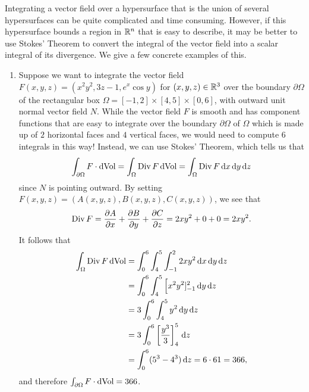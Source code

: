 Integrating a vector field over a hypersurface that is the union of several 
hypersurfaces can be quite complicated and time consuming. However, 
if this hypersurface bounds a region in $\mathbb{R}^n$ that is easy to describe, it 
may be better to use Stokes' Theorem to convert the integral of the 
vector field into a scalar integral of its divergence. We give a few concrete 
examples of this. 
\begin{enumerate}[(1)]
    \item Suppose we want to integrate the vector field $F(x, y, z) = 
    (x^2y^2, 3z-1, e^x\cos y)$ for $(x, y, z) \in \mathbb{R}^3$ over the boundary 
    $\partial\Omega$ of the rectangular box $\Omega = [-1, 2] \times [4, 5] 
    \times [0, 6]$, with outward unit normal vector field $N$. While the 
    vector field $F$ is smooth and has component functions that are 
    easy to integrate over the boundary $\partial\Omega$ of $\Omega$ 
    which is made up of $2$ horizontal faces and $4$ vertical faces, 
    we would need to compute $6$ integrals in this way! Instead, we can use 
    Stokes' Theorem, which tells us that 
    \[ \int_{\partial\Omega} F\cdot\operatorname{dVol} = \int_\Omega \operatorname{Div} F\operatorname{dVol} 
    = \int_\Omega \operatorname{Div} F \,\mathrm{d} x \,\mathrm{d} y \,\mathrm{d} z \] 
    since $N$ is pointing outward. By setting $F(x, y, z) = 
    (A(x, y, z), B(x, y, z), C(x, y, z))$, we see that 
    \[ \operatorname{Div} F = \frac{\partial A}{\partial x} + \frac{\partial B}{\partial y} 
    + \frac{\partial C}{\partial z} = 2xy^2 + 0 + 0 = 2xy^2. \] 
    It follows that 
    \begin{align*}
        \int_\Omega \operatorname{Div} F \operatorname{dVol} 
        &= \int_0^6 \int_4^5 \int_{-1}^2 2xy^2 \,\mathrm{d} x \,\mathrm{d} y \,\mathrm{d} z \\ 
        &= \int_0^6 \int_4^5 \Big[ x^2 y^2 ]_{-1}^2 \,\mathrm{d} y \,\mathrm{d} z \\ 
        &= 3 \int_0^6 \int_4^5 y^2 \,\mathrm{d} y \,\mathrm{d} z \\ 
        &= 3 \int_0^6 \left[ \frac{y^3}{3} \right]_4^5 \,\mathrm{d} z \\ 
        &= \int_0^6 (5^3 - 4^3)\,\mathrm{d} z = 6 \cdot 61 = 366,
    \end{align*}
    and therefore $\int_{\partial\Omega} F \cdot \operatorname{dVol} = 366$. 


\end{enumerate}
